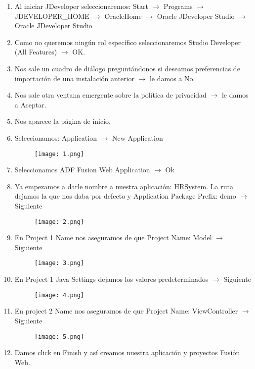 \begin{enumerate}
	\item Al iniciar JDeveloper seleccionaremos: Start $\rightarrow$ Programs $\rightarrow$ JDEVELOPER\_HOME $\rightarrow$ OracleHome $\rightarrow$ Oracle JDeveloper Studio $\rightarrow$ Oracle JDeveloper Studio
	\item Como no queremos ningún rol específico seleccionaremos Studio Developer (All Features) $\rightarrow$ OK.
	\item Nos sale un cuadro de diálogo preguntándonos si deseamos preferencias de importación de una instalación anterior $\rightarrow$ le damos a No.
	\item Nos sale otra ventana emergente sobre la política de privacidad $\rightarrow$ le damos a Aceptar.
	\item Nos aparece la página de inicio.
	\item Seleccionamos: Application $\rightarrow$ New Application
	\begin{figure}[!h]
	  \centering
	    \texttt{[image: 1.png]}
	\end{figure}
	\item Seleccionamos ADF Fusion Web Application $\rightarrow$ Ok
	\item Ya empezamos a darle nombre a nuestra aplicación: HRSystem. La ruta dejamos la que nos daba por defecto y Application Package Prefix: demo $\rightarrow$ Siguiente
	\pagebreak
	\begin{figure}[!h]
	  \centering
	    \texttt{[image: 2.png]}
	\end{figure}
	\item En Project 1 Name nos aseguramos de que Project Name: Model $\rightarrow$ Siguiente
	\begin{figure}[!h]
	  \centering
	    \texttt{[image: 3.png]}
	\end{figure}
	\item En Project 1 Java Settings dejamos los valores predeterminados $\rightarrow$ Siguiente
	\pagebreak
	\begin{figure}[!h]
	  \centering
	    \texttt{[image: 4.png]}
	\end{figure}
	\item En project 2 Name nos aseguramos de que Project Name: ViewController $\rightarrow$ Siguiente
	\begin{figure}[!h]
	  \centering
	    \texttt{[image: 5.png]}
	\end{figure}
	\item Damos click en Finish y así creamos nuestra aplicación y proyectos Fusión Web.

\end{enumerate}

